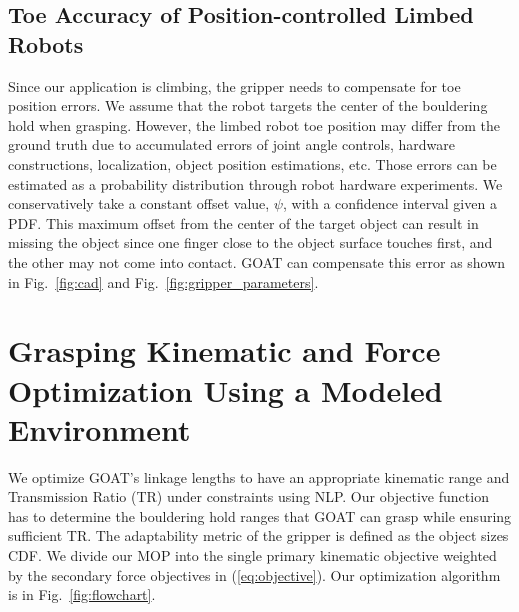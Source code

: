 \documentclass[letterpaper, 10 pt, conference]{ieeeconf}  %
\newcommand{\fig}[1]{Fig.~\ref{#1}}
\newcommand{\eq}[1]{(\ref{#1})}
\begin{document}
\subsection{Toe Accuracy of Position-controlled Limbed Robots \label{sec:offset}}
Since our application is climbing, the gripper needs to compensate for toe position errors. 
We assume that the robot targets the center of the bouldering hold when grasping. However, the limbed robot toe position may differ from the ground truth due to accumulated errors of joint angle controls, hardware constructions, localization, object position estimations, etc. 
Those errors can be estimated as a probability distribution through robot hardware experiments. %
We conservatively take a constant offset value, $\psi$, with a confidence interval given a PDF. This maximum offset from the center of the target object can result in missing the object since one finger close to the object surface touches first, and the other may not come into contact. GOAT can compensate this error as shown in \fig{fig:cad} and \fig{fig:gripper_parameters}.


\section{Grasping Kinematic and Force Optimization Using a Modeled Environment \label{sec:Opti}}
We optimize GOAT's linkage lengths to have an appropriate kinematic range and Transmission Ratio (TR) under constraints using NLP. Our objective function has to determine the bouldering hold ranges that GOAT can grasp while ensuring sufficient TR. The adaptability metric of the gripper is defined as the object sizes CDF. We divide our MOP into the single primary kinematic objective weighted by the secondary force objectives in \eq{eq:objective}. Our optimization algorithm is in \fig{fig:flowchart}. 
\end{document}
